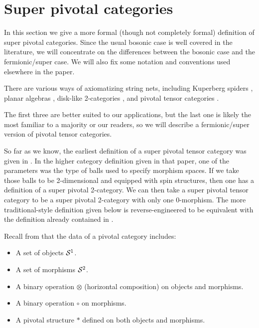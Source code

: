 



\section{Super pivotal categories}  \label{def_sect}

In this section we give a more formal (though not completely formal) definition of super pivotal categories.
Since the usual bosonic case is well covered in the literature, we will concentrate on
the differences between the bosonic case and the fermionic/super case.
We will also fix some notation and conventions used elsewhere in the paper.


There are various ways of axiomatizing string nets, including Kuperberg spiders \cite{kup_spider}, 
planar algebras \cite{jones_pa},
disk-like 2-categories \cite{blob_paper}, and pivotal tensor categories \cite{Barrett1999}.

The first three are better suited to our applications, but the last one is likely the most familiar to a majority or our readers,
so we will describe a fermionic/super version of pivotal tensor categories.

So far as we know, the earliest definition of a super pivotal tensor category was given in \cite{blob_paper}.
In the higher category definition given in that paper, one of the parameters was the type of balls used to 
specify morphism spaces.
If we take those balls to be 2-dimensional and equipped with spin structures, then one has a definition of a super pivotal 2-category.
We can then take a super pivotal tensor category to be a super pivotal 2-category with only one 0-morphism.
The more traditional-style definition given below is reverse-engineered to be
equivalent with the definition already contained in \cite{blob_paper}.

\medskip

Recall from 
\cite{Barrett1999}
that the data of a pivotal category includes:
\begin{itemize}
\item A set of objects $\mathcal{S}^1$.
\item A set of morphisms $\mathcal{S}^2$.
\item A binary operation $\otimes$ (horizontal composition) on objects and morphisms.
\item A binary operation $\circ$ on morphisms.
\item A pivotal structure $*$ defined on both objects and morphisms.
\end{itemize}


